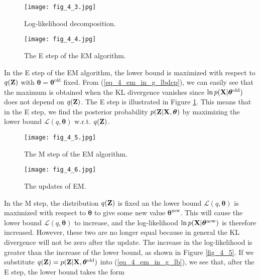 \documentclass[../main.tex]{subfiles}
\begin{document}
\begin{figure}[h]
	\centering
	\begin{minipage}[t]{0.42\linewidth}
		\centering
		\texttt{[image: fig\_4\_3.jpg]}
		\caption{Log-likelihood decomposition.}\label{fig_4_3}
	\end{minipage}
	\begin{minipage}[t]{0.48\linewidth}       
		\centering
		\texttt{[image: fig\_4\_4.jpg]}
		\caption{The E step of the EM algorithm.}\label{fig_4_4}
	\end{minipage}
\end{figure}
\par In the E step of the EM algorithm, the lower bound is maximized with respect to $q({\bf Z})$ with $\bm{\theta}=\bm{\theta}^{\text{old}}$ fixed. From (\ref{eq_4_em_in_g_lbdcp}), we can easily see that the maximum is obtained when the KL divergence vanishes since $\ln p({\bf X}|\bm{\theta}^{\text{old}})$ does not depend on $q({\bf Z})$. The E step is illustrated in Figure \ref{fig_4_4}. This means that in the E step, we find the posterior probability $p({\bf Z}|{\bf X},\bm{\theta})$ by maximizing the lower bound $\mathcal{L}(q,\bm{\theta})$ w.r.t. $q({\bf Z})$.
\begin{figure}[h]
	\centering
	\begin{minipage}[t]{0.42\linewidth}
		\centering
		\texttt{[image: fig\_4\_5.jpg]}
		\caption{The M step of the EM algorithm.}\label{fig_4_5}
	\end{minipage}
	\begin{minipage}[t]{0.48\linewidth}       
		\centering
		\texttt{[image: fig\_4\_6.jpg]}
		\caption{The updates of EM.}\label{fig_4_6}
	\end{minipage}
\end{figure}
\par In the M step, the distribution $q({\bf Z})$ is fixed an the lower bound $\mathcal{L}(q,\bm{\theta})$ is maximized with respect to $\bm{\theta}$ to give some new value $\bm{\theta}^{\text{new}}$. This will cause the lower bound $\mathcal{L}(q,\bm{\theta})$ to increase, and the log-likelihood $\ln p({\bf X}|\bm{\theta}^{\text{new}})$ is therefore increased. However, these two are no longer equal because in general the KL divergence will not be zero after the update. The increase in the log-likelihood is greater than the increase of the lower bound, as shown in Figure \ref{fig_4_5}. If we substitute $q({\bf Z})=p({\bf Z}|{\bf X}, \bm{\theta}^{\text{old}})$ into (\ref{eq_4_em_in_g_lb}), we see that, after the E step, the lower bound takes the form
\end{document}
